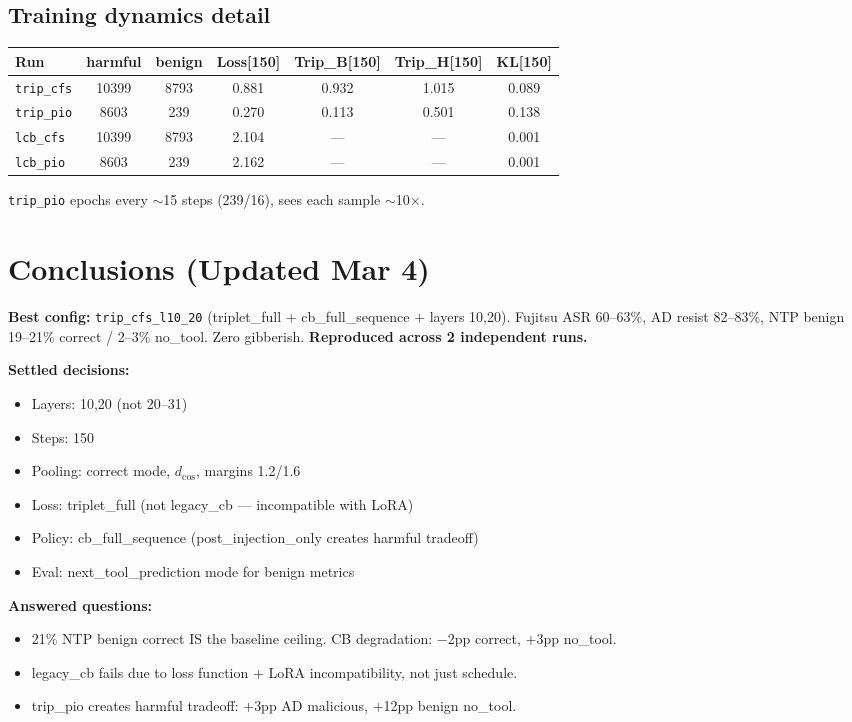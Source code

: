 \documentclass[11pt]{article}
\newcommand{\good}[1]{\textcolor{good}{#1}}
\newcommand{\bad}[1]{\textcolor{bad}{#1}}
\begin{document}
\subsection{Training dynamics detail}
\begin{tabular}{lcccccc}
\toprule
Run & harmful & benign & Loss[150] & Trip\_B[150] & Trip\_H[150] & KL[150] \\
\midrule
\texttt{trip\_cfs} & 10399 & \good{8793} & 0.881 & 0.932 & 1.015 & 0.089 \\
\texttt{trip\_pio} & 8603 & \bad{239} & 0.270 & 0.113 & 0.501 & 0.138 \\
\texttt{lcb\_cfs} & 10399 & 8793 & 2.104 & --- & --- & 0.001 \\
\texttt{lcb\_pio} & 8603 & 239 & 2.162 & --- & --- & 0.001 \\
\bottomrule
\end{tabular}

\texttt{trip\_pio} epochs every $\sim$15 steps (239/16), sees each sample $\sim$10$\times$.

\section{Conclusions (Updated Mar 4)}

\textbf{Best config:} \texttt{trip\_cfs\_l10\_20} (triplet\_full + cb\_full\_sequence + layers 10,20). Fujitsu ASR 60--63\%, AD resist 82--83\%, NTP benign 19--21\% correct / 2--3\% no\_tool. Zero gibberish. \textbf{Reproduced across 2 independent runs.}

\textbf{Settled decisions:}
\begin{itemize}
  \item Layers: 10,20 (not 20--31)
  \item Steps: 150
  \item Pooling: correct mode, $d_\mathrm{cos}$, margins 1.2/1.6
  \item Loss: triplet\_full (not legacy\_cb --- incompatible with LoRA)
  \item Policy: cb\_full\_sequence (post\_injection\_only creates harmful tradeoff)
  \item Eval: next\_tool\_prediction mode for benign metrics
\end{itemize}

\textbf{Answered questions:}
\begin{itemize}
  \item \good{21\% NTP benign correct IS the baseline ceiling.} CB degradation: $-$2pp correct, $+$3pp no\_tool.
  \item \good{legacy\_cb fails due to loss function + LoRA incompatibility}, not just schedule.
  \item \good{trip\_pio creates harmful tradeoff}: $+$3pp AD malicious, $+$12pp benign no\_tool.
\end{itemize}
\end{document}
